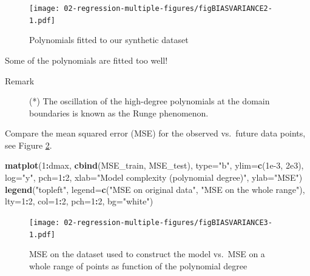 \documentclass[10pt,b5paper,krantz1]{krantz}
\newenvironment{Shaded}{\begin{snugshade}}{\end{snugshade}}
\newcommand{\DataTypeTok}[1]{\textcolor[rgb]{0.27,0.27,0.27}{#1}}
\newcommand{\DecValTok}[1]{\textcolor[rgb]{0.06,0.06,0.06}{#1}}
\newcommand{\FloatTok}[1]{\textcolor[rgb]{0.06,0.06,0.06}{#1}}
\newcommand{\KeywordTok}[1]{\textcolor[rgb]{0.27,0.27,0.27}{\textbf{#1}}}
\newcommand{\NormalTok}[1]{#1}
\newcommand{\OperatorTok}[1]{\textcolor[rgb]{0.43,0.43,0.43}{\textbf{#1}}}
\newcommand{\StringTok}[1]{\textcolor[rgb]{0.5,0.5,0.5}{#1}}
\begin{document}
\begin{figure}
\hypertarget{fig:figBIASVARIANCE2}{%
\centering
\texttt{[image: 02-regression-multiple-figures/figBIASVARIANCE2-1.pdf]}
\caption{Polynomials fitted to our synthetic dataset}\label{fig:figBIASVARIANCE2}
}
\end{figure}

Some of the polynomials are fitted too well!

\begin{description}
\item[Remark]
(*) The oscillation of the high-degree polynomials at the domain
boundaries is known as the Runge phenomenon.
\end{description}

Compare the mean squared error (MSE) for the observed vs.~future data points,
see Figure \ref{fig:figBIASVARIANCE3}.

\begin{Shaded}
\begin{Highlighting}[]
\KeywordTok{matplot}\NormalTok{(}\DecValTok{1}\OperatorTok{:}\NormalTok{dmax, }\KeywordTok{cbind}\NormalTok{(MSE_train, MSE_test), }\DataTypeTok{type=}\StringTok{"b"}\NormalTok{,}
    \DataTypeTok{ylim=}\KeywordTok{c}\NormalTok{(}\FloatTok{1e-3}\NormalTok{, }\FloatTok{2e3}\NormalTok{), }\DataTypeTok{log=}\StringTok{"y"}\NormalTok{, }\DataTypeTok{pch=}\DecValTok{1}\OperatorTok{:}\DecValTok{2}\NormalTok{,}
    \DataTypeTok{xlab=}\StringTok{"Model complexity (polynomial degree)"}\NormalTok{,}
    \DataTypeTok{ylab=}\StringTok{"MSE"}\NormalTok{)}
\KeywordTok{legend}\NormalTok{(}\StringTok{"topleft"}\NormalTok{, }\DataTypeTok{legend=}\KeywordTok{c}\NormalTok{(}\StringTok{"MSE on original data"}\NormalTok{, }\StringTok{"MSE on the whole range"}\NormalTok{),}
    \DataTypeTok{lty=}\DecValTok{1}\OperatorTok{:}\DecValTok{2}\NormalTok{, }\DataTypeTok{col=}\DecValTok{1}\OperatorTok{:}\DecValTok{2}\NormalTok{, }\DataTypeTok{pch=}\DecValTok{1}\OperatorTok{:}\DecValTok{2}\NormalTok{, }\DataTypeTok{bg=}\StringTok{"white"}\NormalTok{)}
\end{Highlighting}
\end{Shaded}

\begin{figure}
\hypertarget{fig:figBIASVARIANCE3}{%
\centering
\texttt{[image: 02-regression-multiple-figures/figBIASVARIANCE3-1.pdf]}
\caption{MSE on the dataset used to construct the model vs.~MSE on a whole range of points as function of the polynomial degree}\label{fig:figBIASVARIANCE3}
}
\end{figure}
\end{document}
